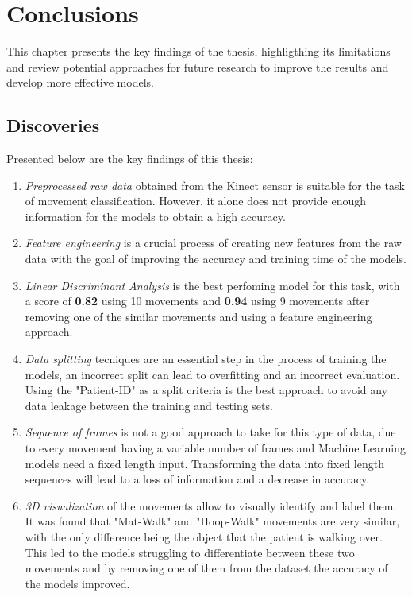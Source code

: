 %
%
%
\chapter{Conclusions} \label{chap:conclusions}

    This chapter presents the key findings of the thesis, highligthing its limitations and review potential approaches for future research to improve the results and develop more effective models.

    \section{Discoveries}

        Presented below are the key findings of this thesis: 
        \begin{enumerate}
            \item \textit{Preprocessed raw data} obtained from the Kinect sensor is suitable for the task of movement classification. However, it alone does not provide enough information for the models to obtain a high accuracy.
            \item \textit{Feature engineering} is a crucial process of creating new features from the raw data with the goal of improving the accuracy and training time of the models.
            \item \textit{Linear Discriminant Analysis} is the best perfoming model for this task, with a score of \textbf{0.82} using 10 movements and \textbf{0.94} using 9 movements after removing one of the similar movements and using a feature engineering approach.
            \item \textit{Data splitting} tecniques are an essential step in the process of training the models, an incorrect split can lead to overfitting and an incorrect evaluation. Using the "Patient-ID" as a split criteria is the best approach to avoid any data leakage between the training and testing sets.
            \item \textit{Sequence of frames} is not a good approach to take for this type of data, due to every movement having a variable number of frames and Machine Learning models need a fixed length input. Transforming the data into fixed length sequences will lead to a loss of information and a decrease in accuracy.
            \item \textit{3D visualization} of the movements allow to visually identify and label them. It was found that "Mat-Walk" and "Hoop-Walk" movements are very similar, with the only difference being the object that the patient is walking over. This led to the models struggling to differentiate between these two movements and by removing one of them from the dataset the accuracy of the models improved.
        \end{enumerate}
    

